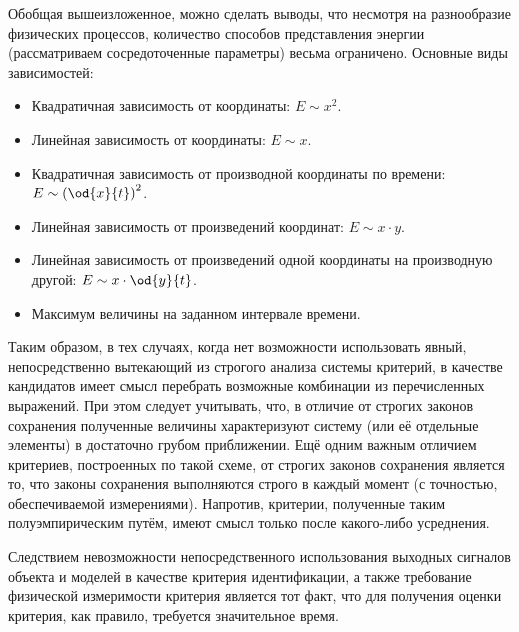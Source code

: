 Обобщая вышеизложенное, можно сделать выводы, что
несмотря на разнообразие физических процессов, количество способов
представления энергии (рассматриваем сосредоточенные параметры)
весьма ограничено. Основные виды зависимостей:

\begin{itemize}

  \item
    Квадратичная зависимость от координаты: $E \sim x^2$.

  \item
    Линейная зависимость от координаты: $E \sim x$.

  \item
    Квадратичная зависимость от производной координаты по времени: $E \sim \left( \od{x}{t}\right)^2$.

  \item
    Линейная зависимость от произведений координат: $E \sim x \cdot y$.

  \item
    Линейная зависимость от произведений одной координаты на производную другой: $E \sim x \cdot \od{y}{t}$.

  \item
    Максимум величины на заданном интервале времени.

\end{itemize}

Таким образом, в тех случаях, когда нет возможности
использовать явный, непосредственно вытекающий
из строгого анализа системы критерий, в качестве кандидатов
имеет смысл перебрать возможные комбинации из перечисленных выражений.
При этом следует учитывать, что, в отличие от строгих законов сохранения
полученные величины характеризуют систему (или её отдельные элементы)
в достаточно грубом приближении.
Ещё одним важным отличием критериев, построенных по такой схеме,
от строгих законов сохранения является то,
что законы сохранения выполняются строго в каждый момент
(с точностью, обеспечиваемой измерениями). Напротив,
критерии, полученные таким полуэмпирическим путём,
имеют смысл только после какого-либо усреднения.








Следствием невозможности непосредственного использования выходных
сигналов объекта и моделей в качестве критерия идентификации, а также
требование физической измеримости критерия является
тот факт, что для получения оценки критерия, как правило,
требуется значительное время.






